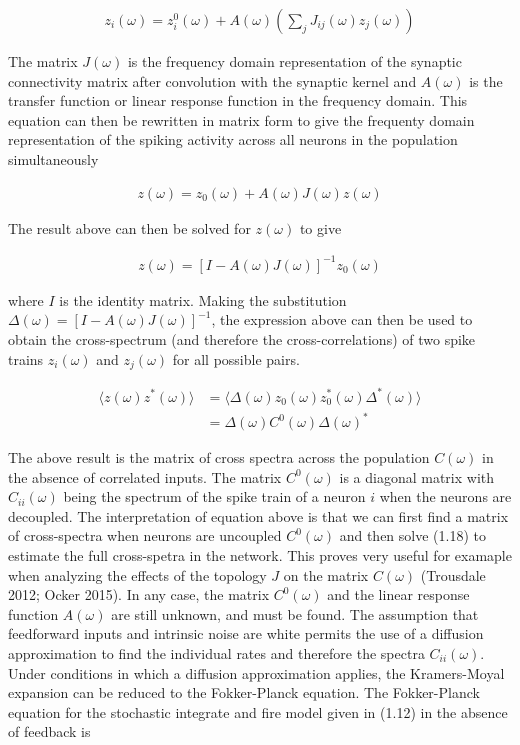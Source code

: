 \documentclass{ucetd}
\begin{document}
\begin{align}
z_{i}(\omega) = z_{i}^{0}(\omega) + A(\omega)\left(\sum_{j}J_{ij}(\omega)z_{j}(\omega)\right)
\end{align}

The matrix $J(\omega)$ is the frequency domain representation of the synaptic connectivity matrix after convolution with the synaptic kernel and $A(\omega)$ is the transfer function or linear response function in the frequency domain. This equation can then be rewritten in matrix form to give the frequenty domain representation of the spiking activity across all neurons in the population simultaneously

\begin{align}
z(\omega) = z_{0}(\omega) + A(\omega)J(\omega)z(\omega)
\end{align}

The result above can then be solved for $z(\omega)$ to give 


\begin{align}
z(\omega) = \left[I-A(\omega)J(\omega)\right]^{-1}z_{0}(\omega)
\end{align}

where $I$ is the identity matrix. Making the substitution $\Delta(\omega) = \left[I-A(\omega)J(\omega)\right]^{-1}$, the expression above can then be used to obtain the cross-spectrum (and therefore the cross-correlations) of two spike trains $z_{i}(\omega)$ and $z_{j}(\omega)$ for all possible pairs. 

\begin{align}
\langle z(\omega)z^{*}(\omega)\rangle &= \langle \Delta(\omega)z_{0}(\omega)z_{0}^{*}(\omega)\Delta^{*}(\omega)\rangle\\
&= \Delta(\omega)C^{0}(\omega)\Delta(\omega)^{*}
\end{align}

The above result is the matrix of cross spectra across the population $C(\omega)$ in the absence of correlated inputs. The matrix $C^{0}(\omega)$ is a diagonal matrix with $C_{ii}(\omega)$ being the spectrum of the spike train of a neuron $i$ when the neurons are decoupled. The interpretation of equation above is that we can first find a matrix of cross-spectra when neurons are uncoupled $C^{0}(\omega)$ and then solve (1.18) to estimate the full cross-spetra in the network. This proves very useful for examaple when analyzing the effects of the topology $J$ on the matrix $C(\omega)$ (Trousdale 2012; Ocker 2015). In any case, the matrix $C^{0}(\omega)$ and the linear response function $A(\omega)$ are still unknown, and must be found. The assumption that feedforward inputs and intrinsic noise are white permits the use of a diffusion approximation to find the individual rates and therefore the spectra $C_{ii}(\omega)$. Under conditions in which a diffusion approximation applies, the Kramers-Moyal expansion can be reduced to the Fokker-Planck equation. The Fokker-Planck equation for the stochastic integrate and fire model given in (1.12) in the absence of feedback is
\end{document}
